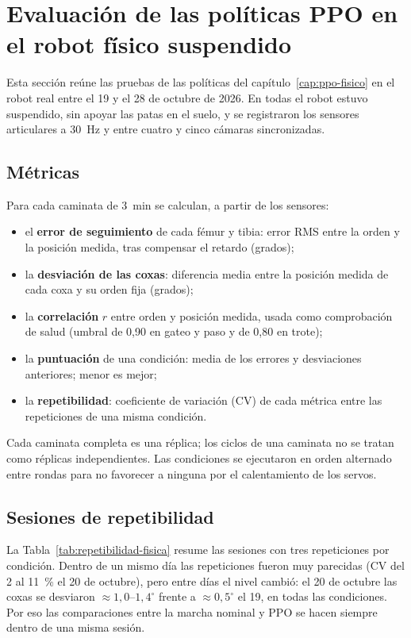 \section{Evaluación de las políticas PPO en el robot físico suspendido}
\label{sec:resultados-robot-fisico}

Esta sección reúne las pruebas de las políticas del
capítulo~\ref{cap:ppo-fisico} en el robot real entre el 19 y el 28 de octubre de
2026. En todas el robot estuvo suspendido, sin apoyar las patas en el suelo, y
se registraron los sensores articulares a 30~Hz y entre cuatro y cinco cámaras
sincronizadas.

\subsection{Métricas}

Para cada caminata de 3~min se calculan, a partir de los sensores:
\begin{itemize}
    \item el \textbf{error de seguimiento} de cada fémur y tibia: error RMS entre
    la orden y la posición medida, tras compensar el retardo (grados);
    \item la \textbf{desviación de las coxas}: diferencia media entre la posición
    medida de cada coxa y su orden fija (grados);
    \item la \textbf{correlación} $r$ entre orden y posición medida, usada como
    comprobación de salud (umbral de 0,90 en gateo y paso y de 0,80 en trote);
    \item la \textbf{puntuación} de una condición: media de los errores y
    desviaciones anteriores; menor es mejor;
    \item la \textbf{repetibilidad}: coeficiente de variación (CV) de cada
    métrica entre las repeticiones de una misma condición.
\end{itemize}
Cada caminata completa es una réplica; los ciclos de una caminata no se tratan
como réplicas independientes. Las condiciones se ejecutaron en orden alternado
entre rondas para no favorecer a ninguna por el calentamiento de los servos.

\subsection{Sesiones de repetibilidad}

La Tabla~\ref{tab:repetibilidad-fisica} resume las sesiones con tres
repeticiones por condición. Dentro de un mismo día las repeticiones fueron muy
parecidas (CV del 2 al 11~\% el 20 de octubre), pero entre días el nivel
cambió: el 20 de octubre las coxas se desviaron $\approx1{,}0$--$1{,}4^\circ$
frente a $\approx0{,}5^\circ$ el 19, en todas las condiciones. Por eso las
comparaciones entre la marcha nominal y PPO se hacen siempre dentro de una
misma sesión.

